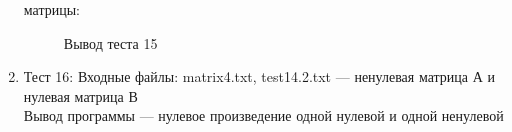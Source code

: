 \documentclass[12pt, a4paper]{article}
\begin{document}
\begin{enumerate}
	матрицы:
	\begin{figure}[h]
  		\caption{Вывод теста 15}
	\end{figure}
	\newpage
	\item Тест 16: Входные файлы: matrix4.txt, 
	test14.2.txt --- ненулевая матрица А и нулевая матрица 
	В\\
	Вывод программы --- нулевое произведение одной нулевой и одной ненулевой 

\end{enumerate}
\end{document}
